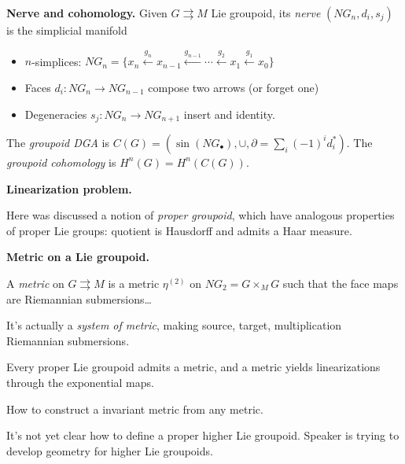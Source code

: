 \medskip\noindent
{\bf Nerve and cohomology.}
Given $G \rightrightarrows M$ Lie groupoid,
its \emph{nerve} $(NG_n,d_i,s_j)$ is the
simplicial manifold
\begin{itemize}
\item $n$-simplices: $NG_n=\{x_n
\overset{g_n}{\leftarrow}x_{n-1}
\overset{g_{n-1}}{\leftarrow}\cdots
\overset{g_2}{\leftarrow}x_1
\overset{g_1}{\leftarrow}x_0\}$
\item Faces $d_i:NG_n \to NG_{n-1}$ compose
two arrows (or forget one)
\item Degeneracies $s_j:NG_n \to NG_{n+1}$
insert and identity.
\end{itemize}
The \emph{groupoid DGA} is
$C(G)=(\operatorname{sin}(NG_\bullet),\cup
,\partial=\sum_{i}(-1)^i d_i^*)$. The
\emph{groupoid cohomology} is
$H^{n}(G)=H^{n}(C(G))$.

\medskip\noindent
{\bf Linearization problem.}
\begin{remark}
\label{remark-hoyo-proper}
Here was discussed a notion of \emph{proper
groupoid}, which have analogous properties of
proper Lie groups: quotient is Hausdorff and
admits a Haar measure.
\end{remark}

\medskip\noindent
{\bf Metric on a Lie groupoid.}

\begin{definition}
\label{definition-hoyo-metric}
A \emph{metric} on $G \rightrightarrows M$ is
a metric $\eta^{(2)}$ on $NG_2=G \times_M G$
such that the face maps are Riemannian
submersions\ldots{}
\end{definition}
It's actually a \emph{system of metric},
making source, target, multiplication
Riemannian submersions.

\begin{theorem}[dH-Fernandes, 2018]
\label{theorem-hoyo-metric}
Every proper Lie groupoid admits a metric,
and a metric yields linearizations through
the exponential maps.
\end{theorem}

\begin{remark}
\label{remark-hoyo-invariant-metric}
How to construct a invariant metric from any
metric.
\end{remark}

\begin{remark}
\label{remark-hoyo-future}
It's not yet clear how to define a proper
higher Lie groupoid. Speaker is trying to
develop geometry for higher Lie groupoids.
\end{remark}

